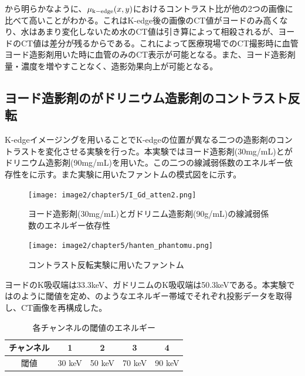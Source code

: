 から明らかなように、$\mu_{\rm{k-edge}}(x,y)$におけるコントラスト比が他の2つの画像に比べて高いことがわかる。これはK-edge後の画像のCT値がヨードのみ高くなり、水はあまり変化しないため水のCT値は引き算によって相殺されるが、ヨードのCT値は差分が残るからである。これによって医療現場でのCT撮影時に血管ヨード造影剤用いた時に血管のみのCT表示が可能となる。また、ヨード造影剤量・濃度を増やすことなく、造影効果向上が可能となる。



\subsection{ヨード造影剤のがドリニウム造影剤のコントラスト反転}
K-edgeイメージングを用いることでK-edgeの位置が異なる二つの造影剤のコントラストを変化させる実験を行った。本実験ではヨード造影剤(30mg/mL)とがドリニウム造影剤(90mg/mL)を用いた。この二つの線減弱係数のエネルギー依存性をに示す。また実験に用いたファントムの模式図をに示す。


\begin{figure}[H]
 \begin{center}
 \texttt{[image: image2/chapter5/I\_Gd\_atten2.png]} 
 \end{center}
 \caption{ヨード造影剤(30mg/mL)とガドリニム造影剤(90g/mL)の線減弱係数のエネルギー依存性}
 \label{fig:I_Gd_atten}
\end{figure}

\begin{figure}[H]
 \begin{center}
 \texttt{[image: image2/chapter5/hanten\_phantomu.png]} 
 \end{center}
 \caption{コントラスト反転実験に用いたファントム}
 \label{fig:hanten_phantomu}
\end{figure}

ヨードのK吸収端は33.3keV、ガドリニムのK吸収端は50.3keVである。本実験ではのように閾値を定め、のようなエネルギー帯域でそれぞれ投影データを取得し、CT画像を再構成した。

\begin{table}[htbp]
  \centering
    \begin{tabular}{ccccc}
    \toprule
    チャンネル & 1     & 2     & 3     & 4 \\
    \midrule
    閾値    & 30 keV & 50 keV & 70 keV  & 90 keV \\
    \bottomrule
    \end{tabular}%
      \caption{各チャンネルの閾値のエネルギー}
  \label{tab: vth2}%
\end{table}%

